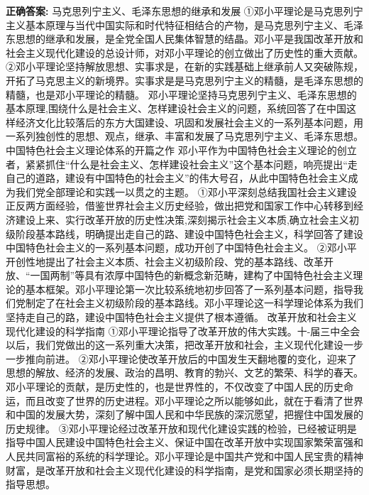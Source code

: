 \documentclass[12pt,UTF8]{ctexart}
\begin{document}
\textbf{正确答案:}
马克思列宁主义、毛泽东思想的继承和发展
①邓小平理论是马克思列宁主义基本原理与当代中国实际和时代特征相结合的产物，是马克思列宁主义、毛泽东思想的继承和发展，是全党全国人民集体智慧的结晶。邓小平是我国改革开放和社会主义现代化建设的总设计师，对邓小平理论的创立做出了历史性的重大贡献。
②邓小平理论坚持解放思想、实事求是，在新的实践基础上继承前人又突破陈规，开拓了马克思主义的新境界。实事求是是马克思列宁主义的精髓，是毛泽东思想的精髓，也是邓小平理论的精髓。
邓小平理论坚持马克思列宁主义、毛泽东思想的基本原理,围绕什么是社会主义、怎样建设社会主义的问题，系统回答了在中国这样经济文化比较落后的东方大国建设、巩固和发展社会主义的一系列基本问题，用一系列独创性的思想、观点，继承、丰富和发展了马克思列宁主义、毛泽东思想。
中国特色社会主义理论体系的开篇之作
邓小平作为中国特色社会主义理论的创立者，紧紧抓住“什么是社会主义、怎样建设社会主义”这个基本问题，响亮提出“走自己的道路，建设有中国特色的社会主义”的伟大号召，从此中国特色社会主义成为我们党全部理论和实践一以贯之的主题。
①邓小平深刻总结我国社会主义建设正反两方面经验，借鉴世界社会主义历史经验，做出把党和国家工作中心转移到经济建设上来、实行改革开放的历史性决策,深刻揭示社会主义本质,确立社会主义初级阶段基本路线，明确提出走自己的路、建设中国特色社会主义，科学回答了建设中国特色社会主义的一系列基本问题，成功开创了中国特色社会主义。
②邓小平开创性地提出了社会主义本质、社会主义初级阶段、党的基本路线、改革开放、“一国两制”等具有浓厚中国特色的新概念新范畴，建构了中国特色社会主义理论的基本框架。邓小平理论第一次比较系统地初步回答了一系列基本问题，指导我们党制定了在社会主义初级阶段的基本路线。邓小平理论这一科学理论体系为我们坚持走自己的路，建设中国特色社会主义提供了根本遵循。
改革开放和社会主义现代化建设的科学指南
①邓小平理论指导了改革开放的伟大实践。十-届三中全会以后，我们党做出的这一系列重大决策，把改革开放和社会，主义现代化建设一步一步推向前进。
②邓小平理论使改革开放后的中国发生天翻地覆的变化，迎来了思想的解放、经济的发展、政治的昌明、教育的勃兴、文艺的繁荣、科学的春天。邓小平理论的贡献，是历史性的，也是世界性的，不仅改变了中国人民的历史命运，而且改变了世界的历史进程。邓小平理论之所以能够如此，就在于看清了世界和中国的发展大势，深刻了解中国人民和中华民族的深沉愿望，把握住中国发展的历史规律。
③邓小平理论经过改革开放和现代化建设实践的检验，已经被证明是指导中国人民建设中国特色社会主义、保证中国在改革开放中实现国家繁荣富强和人民共同富裕的系统的科学理论。邓小平理论是中国共产党和中国人民宝贵的精神财富，是改革开放和社会主义现代化建设的科学指南，是党和国家必须长期坚持的指导思想。

\vspace{0.3em}\hrulefill\vspace{0.7em}
\end{document}
